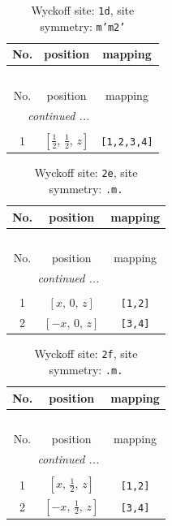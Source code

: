\documentclass[fleqn,8pt]{jsarticle}
\begin{document}
\renewcommand{\arraystretch}{1.2}
\begin{longtable}{ccc}
\caption{Wyckoff site: {\tt 1d}, site symmetry: {\tt m'm2'}}
 \\
 \hline \hline
No. & position & mapping \\ \hline \endfirsthead

\multicolumn{2}{l}{\tablename\ \thetable{}} \\
 \hline \hline
No. & position & mapping \\ \hline \endhead

 \hline \hline
\multicolumn{2}{r}{\footnotesize\it continued ...} \\ \endfoot

 \hline \hline
\multicolumn{2}{r}{} \\ \endlastfoot

1 & $\left[ \frac{1}{2},\, \frac{1}{2},\, z \right]$ & {\tt [1,2,3,4]} \\
\end{longtable}
\renewcommand{\arraystretch}{1.2}
\begin{longtable}{ccc}
\caption{Wyckoff site: {\tt 2e}, site symmetry: {\tt .m.}}
 \\
 \hline \hline
No. & position & mapping \\ \hline \endfirsthead

\multicolumn{2}{l}{\tablename\ \thetable{}} \\
 \hline \hline
No. & position & mapping \\ \hline \endhead

 \hline \hline
\multicolumn{2}{r}{\footnotesize\it continued ...} \\ \endfoot

 \hline \hline
\multicolumn{2}{r}{} \\ \endlastfoot

1 & $\left[ x,\, 0,\, z \right]$ & {\tt [1,2]} \\ \hline
2 & $\left[ - x,\, 0,\, z \right]$ & {\tt [3,4]} \\
\end{longtable}
\renewcommand{\arraystretch}{1.2}
\begin{longtable}{ccc}
\caption{Wyckoff site: {\tt 2f}, site symmetry: {\tt .m.}}
 \\
 \hline \hline
No. & position & mapping \\ \hline \endfirsthead

\multicolumn{2}{l}{\tablename\ \thetable{}} \\
 \hline \hline
No. & position & mapping \\ \hline \endhead

 \hline \hline
\multicolumn{2}{r}{\footnotesize\it continued ...} \\ \endfoot

 \hline \hline
\multicolumn{2}{r}{} \\ \endlastfoot

1 & $\left[ x,\, \frac{1}{2},\, z \right]$ & {\tt [1,2]} \\ \hline
2 & $\left[ - x,\, \frac{1}{2},\, z \right]$ & {\tt [3,4]} \\
\end{longtable}
\end{document}
